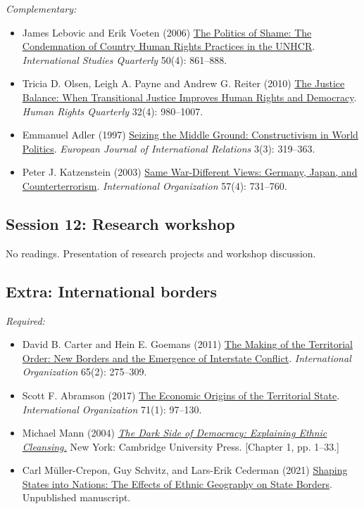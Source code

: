 \documentclass[12pt, a4paper]{article}
\begin{document}
\noindent\textit{Complementary:}

\begin{itemize}
	\item James Lebovic and Erik Voeten (2006) \href{https://doi.org/10.1111/j.1468-2478.2006.00429.x}{The Politics of Shame: The Condemnation of Country Human Rights Practices in the UNHCR}. \textit{International Studies Quarterly} 50(4): 861--888.
	\item Tricia D. Olsen, Leigh A. Payne and Andrew G. Reiter (2010) \href{https://doi.org/10.1353/hrq.2010.0021}{The Justice Balance: When Transitional Justice Improves Human Rights and Democracy}. \textit{Human Rights Quarterly} 32(4): 980--1007.
	\item Emmanuel Adler (1997) \href{https://doi.org/10.1177/1354066197003003003}{Seizing the Middle Ground: Constructivism in World Politics}. \textit{European Journal of International Relations} 3(3): 319--363.
	\item Peter J. Katzenstein (2003) \href{https://doi.org/10.1017/S0020818303574033}{Same War-Different Views: Germany, Japan, and Counterterrorism}. \textit{International Organization} 57(4): 731--760.
\end{itemize}

\hline
\subsection*{Session 12: Research workshop}

No readings. Presentation of research projects and workshop discussion.


\vspace{20pt}
\hline
\subsection*{Extra: International borders}

\noindent\textit{Required:}

\begin{itemize}
	\item David B. Carter and Hein E. Goemans (2011) \href{https://doi.org/10.1017/S0020818311000051}{The Making of the Territorial Order: New Borders and the Emergence of Interstate Conflict}. \textit{International Organization} 65(2): 275--309.
	\item Scott F. Abramson (2017) \href{https://doi.org/10.1017/S0020818316000308}{The Economic Origins of the Territorial State}. \textit{International Organization} 71(1): 97--130.
	\item Michael Mann (2004) \href{https://www.cambridge.org/core/books/dark-side-of-democracy/7E75A132A188A2804E91F4F209B6FE1F}{\textit{The Dark Side of Democracy: Explaining Ethnic Cleansing.}} New York: Cambridge University Press. [Chapter 1, pp. 1--33.]
	\item Carl Müller-Crepon, Guy Schvitz, and Lars-Erik Cederman (2021) \href{http://www.carlmueller-crepon.org/publication/state_shape/}{Shaping States into Nations: The Effects of Ethnic Geography on State Borders}. Unpublished manuscript.
\end{itemize}
\end{document}
